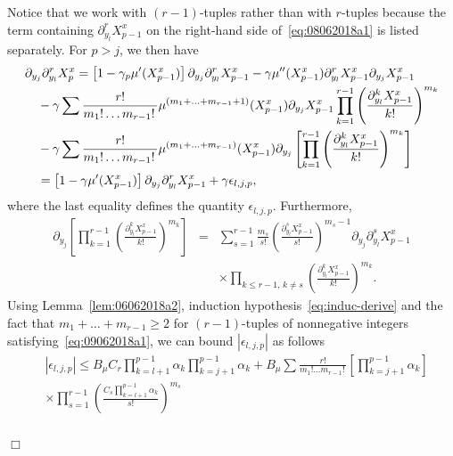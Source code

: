 \documentclass[bj]{imsart}
\newcommand{\proofendsign}{$\Box$}
\newenvironment{proof}{{\noindent \bf Proof }}
 {{\hspace*{\fill}\proofendsign\par\bigskip}}
\begin{document}
\begin{proof}
\begin{equation}
\end{equation}
Notice that we work with $(r-1)$-tuples
rather than with $r$-tuples
because the term containing
$\partial_{y_l}^r X^x_{p-1}$
on the right-hand side of~\eqref{eq:08062018a1}
is listed separately.
For $p>j$, we then have
\begin{align}
&\partial_{y_{j}}\partial_{y_{l}}^{r}X^x_{p}
=\left[1-\gamma_{p}\mu'(X^x_{p-1})\right]\partial_{y_{j}}\partial_{y_{l}}^{r}X^x_{p-1}-\gamma\mu''(X^x_{p-1})\partial_{y_{l}}^{r}X^x_{p-1}\partial_{y_{j}}X^x_{p-1}
\label{eq:09062018a2}\\
&\hspace{1em}-\gamma\sum\frac{r!}{m_{1}!\ldots m_{r-1}!\,}\mu^{(m_{1}+\ldots+m_{r-1}+1)}(X^x_{p-1})\partial_{y_{j}}X^x_{p-1}\prod_{k=1}^{r-1}\left(\frac{\partial_{y_{l}}^{k}X^x_{p-1}}{k!}\right)^{m_{k}}
\notag\\
&\hspace{1em}-\gamma\sum\frac{r!}{m_{1}!\ldots m_{r-1}!\,}\mu^{(m_{1}+\ldots+m_{r-1})}(X^x_{p-1})\partial_{y_{j}}\left[\prod_{k=1}^{r-1}\left(\frac{\partial_{y_{l}}^{k}X^x_{p-1}}{k!}\right)^{m_{k}}\right]
\notag\\
&\hspace{1em} =\left[1-\gamma\mu'(X^x_{p-1})\right]\partial_{y_{j}}\partial_{y_{l}}^{r}X^x_{p-1}+\gamma\epsilon_{l,j,p},
\notag
\end{align}
where the last equality defines the quantity $\epsilon_{l,j,p}$.
Furthermore,
\begin{eqnarray*}
\partial_{y_{j}}\left[\prod_{k=1}^{r-1}\left(\frac{\partial_{y_{l}}^{k}X^x_{p-1}}{k!}\right)^{m_{k}}\right]&=&\sum_{s=1}^{r-1}\frac{m_{s}}{s!}\left(\frac{\partial_{y_{l}}^{s}X^x_{p-1}}{s!}\right)^{m_{s}-1}\partial_{y_{j}}\partial_{y_{l}}^{s}X^x_{p-1}
\\
&& \times \prod_{k\le r-1,\,k\neq s}\left(\frac{\partial_{y_{l}}^{k}X^x_{p-1}}{k!}\right)^{m_{k}}.
\end{eqnarray*}
Using Lemma~\ref{lem:06062018a2},
induction hypothesis~\eqref{eq:induc-derive}
and the fact that $m_{1}+\ldots+m_{r-1}\ge2$
for $(r-1)$-tuples of nonnegative integers
satisfying~\eqref{eq:09062018a1},
we can bound $|\epsilon_{l,j,p}|$ as follows
\begin{align*}
&\left|\epsilon_{l,j,p}\right|  \leq  B_{\mu}C_{r}\prod_{k=l+1}^{p-1}\alpha_{k}\prod_{k=j+1}^{p-1}\alpha_{k}+B_{\mu}\sum\frac{r!}{m_{1}!\ldots m_{r-1}!\,}\left[\prod_{k=j+1}^{p-1}\alpha_{k}\right]
\\
&\times \prod_{s=1}^{r-1}\left(\frac{C_{s}\prod_{k=l+1}^{p-1}\alpha_{k}}{s!}\right)^{m_{s}}\\

\end{align*}
\end{proof}
\end{document}
